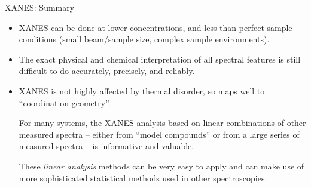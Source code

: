 
\begin{slide}{XANES: Summary}
  \begin{cenpage}{110mm}
    \begin{itemize}
    \item  {}
      \vspace{2mm}

      XANES can be done at lower concentrations, and
      less-than-perfect sample conditions (small beam/sample size, complex
      sample environments).

      \vmm

    \item {}
      \vspace{2mm}

      The exact physical and chemical interpretation of all spectral
      features is still difficult to do accurately, precisely, and
      reliably.

      \vmm

    \item {}
      \vspace{2mm}

      XANES is not highly affected by thermal disorder, so maps well to
      ``coordination geometry''.
      \vmm

      For many systems, the XANES analysis based on linear combinations of
      other measured spectra -- either from ``model compounds'' or from a
      large series of measured spectra -- is informative and valuable.


      \vmm These {\emph{linear analysis}} methods can be very easy to apply
      and can make use of more sophisticated statistical methods used in
      other spectroscopies.

    \end{itemize}
  \end{cenpage}
\end{slide}

